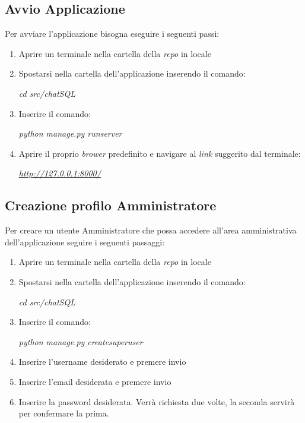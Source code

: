 \documentclass[5pt]{article}
\begin{document}
		\subsection{Avvio Applicazione}
			Per avviare l'applicazione bisogna eseguire i seguenti passi:
			\begin{enumerate}
				\item Aprire un terminale nella cartella della \textit{repo} in locale
				\item Spostarsi nella cartella dell'applicazione inserendo il comando:
					\begin{center}
						\textit{cd src/chatSQL}
					\end{center}
				\item Inserire il comando:
					\begin{center}
						\textit{python manage.py runserver}
					\end{center}
				\item Aprire il proprio \textit{brower} predefinito e navigare al \textit{link} suggerito dal terminale:
					\begin{center}
						\textit{\url{http://127.0.0.1:8000/}}
					\end{center}
			\end{enumerate}
 
	    \subsection{Creazione profilo Amministratore}
	    Per creare un utente Amministratore che possa accedere all'area amministrativa dell'applicazione seguire i seguenti passaggi:
	    \begin{enumerate}
	    	\item Aprire un terminale nella cartella della \textit{repo} in locale
	    	\item Spostarsi nella cartella dell'applicazione inserendo il comando:
	    	\begin{center}
	    		\textit{cd src/chatSQL}
	    	\end{center}
	    	\item Inserire il comando:
	    	\begin{center}
	    		\textit{python manage.py createsuperuser}
	    	\end{center}
	    	\item Inserire l'username desiderato e premere invio
	    	\item Inserire l'email desiderata e premere invio
	    	\item Inserire la password desiderata. Verrà richiesta due volte, la seconda servirà per confermare la prima.
	    \end{enumerate}
    
\end{document}
